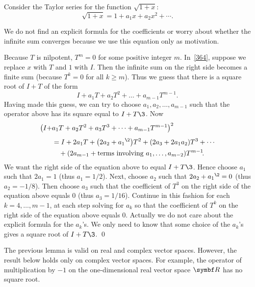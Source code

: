 
\proof
Consider the Taylor series for the function $\sqrt{1 +
x}$:
\begin{equation} \label{364}
\sqrt{1 + x} = 1 + a_1 x + a_2 x^2 + \dotsb .
\end{equation}%


We do not find an explicit formula for the coefficients or worry about whether the infinite sum converges because we use this equation only as \mbox{motivation}.

Because $T$ is nilpotent, $T^m = 0$ for some positive integer $m$.  In~\ref{364},
suppose we replace $x$ with $T$ and $1$ with $I$.  Then the infinite sum on the right
side becomes a finite sum (because $T^k = 0$ for all $k \ge m$).  Thus we
guess that there is a square root of $I + T$ of the form
\[
I + a_1 T + a_2 T^2 + \dots + a_{m-1} T^{m-1}\!.
\]
Having made this guess, we can try to choose $a_1, a_2, \dots, a_{m-1}$ such that
the operator above has its square equal to $I + T\3$.  Now
\begin{align*}
\paren[\big]{I + & a_1 T + a_2 T^2 + a_3 T^3 + \dots + a_{m-1} T^{m-1}}^2 \\[4bp]
& = I + 2a_1 T + \paren[\big]{2a_2 + {a_1}^{\2}} T^2 + (2a_3 + 2 a_1 a_2) T^3 + \dotsb \\
& \quad {} + (2a_{m-1} + \text{terms involving $a_1, \dots, a_{m-2}$}) T^{m-1}\!.
\end{align*}
We want the right side of the equation above to equal $I + T\3$.  Hence
choose $a_1$ such that $2a_1 = 1$ (thus $a_1 = 1/2$).  Next, choose $a_2$ such
that $2a_2 + {a_1}^{\2} = 0$ (thus $a_2 = -1/8$).  Then choose $a_3$ such that the
coefficient of $T^3$ on the right side of the equation above equals $0$ (thus
$a_3 = 1/16$).  Continue in this fashion for each $k = 4, \dots, m-1$, at each step solving
for $a_k$ so that the coefficient of $T^k$ on the right side of the equation above
equals $0$.  Actually we do not care about the explicit formula for the $a_k$'s.  We
only need to know that some choice of the $a_k$'s gives a square root of $I + T\3$.
\qed

The previous lemma is valid on real and complex vector spaces.
However, the result below holds only on complex vector spaces. For example, the
operator of multiplication by $-1$ on the one-dimensional real vector space $\R{}$ has no square root.


